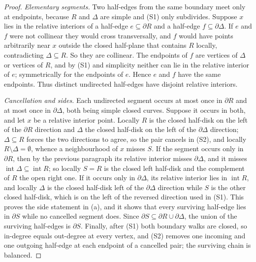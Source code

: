 \documentclass[11pt]{amsart}
\theoremstyle{definition}
\theoremstyle{remark}
\begin{document}
\begin{proof}
\emph{Elementary segments.}  Two half-edges from the same boundary meet only
at endpoints, because $R$ and $\Delta$ are simple and (S1) only subdivides.
Suppose $x$ lies in the relative interiors of a half-edge $e\subseteq\partial
R$ and a half-edge $f\subseteq\partial\Delta$.  If $e$ and $f$ were not
collinear they would cross transversally, and $f$ would have points
arbitrarily near $x$ outside the closed half-plane that contains $R$ locally,
contradicting $\Delta\subseteq R$.  So they are collinear.  The endpoints of
$f$ are vertices of $\Delta$ or vertices of $R$, and by (S1) and simplicity
neither can lie in the relative interior of $e$; symmetrically for the
endpoints of $e$.  Hence $e$ and $f$ have the same endpoints.  Thus distinct
undirected half-edges have disjoint relative interiors.

\emph{Cancellation and sides.}  Each undirected segment occurs at most once
in $\partial R$ and at most once in $\partial\Delta$, both being simple
closed curves.  Suppose it occurs in both, and let $x$ be a relative interior
point.  Locally $R$ is the closed half-disk on the left of the $\partial R$
direction and $\Delta$ the closed half-disk on the left of the
$\partial\Delta$ direction; $\Delta\subseteq R$ forces the two directions to
agree, so the pair cancels in (S2), and locally $R\setminus\Delta=\emptyset$,
whence a neighbourhood of $x$ misses $S$.  If the segment occurs only in
$\partial R$, then by the previous paragraph its relative interior misses
$\partial\Delta$, and it misses $\operatorname{int}\Delta\subseteq
\operatorname{int}R$; so locally $S=R$ is the closed left half-disk and the
complement of $R$ the open right one.  If it occurs only in
$\partial\Delta$, its relative interior lies in $\operatorname{int}R$, and
locally $\Delta$ is the closed half-disk left of the $\partial\Delta$
direction while $S$ is the other closed half-disk, which is on the left of
the reversed direction used in (S1).  This proves the side statement in (a),
and it shows that every surviving half-edge lies in $\partial S$ while no
cancelled segment does.  Since $\partial S\subseteq\partial R\cup
\partial\Delta$, the union of the surviving half-edges is $\partial S$.
Finally, after (S1) both boundary walks are closed, so in-degree equals
out-degree at every vertex, and (S2) removes one incoming and one outgoing
half-edge at each endpoint of a cancelled pair; the surviving chain is
balanced.


\end{proof}
\end{document}
